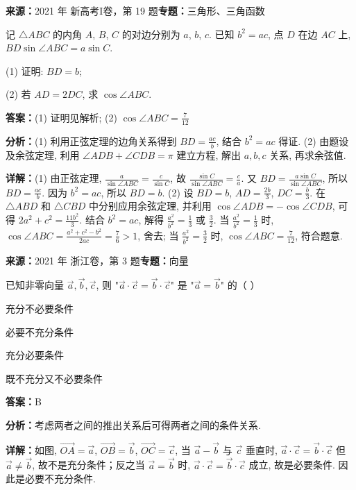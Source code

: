 \begin{question}[points=12]
\textbf{来源：}2021 年 新高考I卷，第 19 题\quad \textbf{专题：}三角形、三角函数\par
记 $\triangle ABC$ 的内角 $A$, $B$, $C$ 的对边分别为 $a$, $b$, $c$. 已知 $b^2 = ac$, 点 $D$ 在边 $AC$ 上, $BD \sin\angle ABC = a \sin C$.

(1) 证明: $BD = b$;

(2) 若 $AD = 2DC$, 求 $\cos\angle ABC$.
\begin{solution}
\textbf{答案：}(1) 证明见解析; (2) $\cos\angle ABC = \frac{7}{12}$

\textbf{分析：}(1) 利用正弦定理的边角关系得到 $BD = \frac{ac}{b}$, 结合 $b^2 = ac$ 得证. (2) 由题设及余弦定理, 利用 $\angle ADB + \angle CDB = \pi$ 建立方程, 解出 $a,b,c$ 关系, 再求余弦值.

\textbf{详解：}(1) 由正弦定理, $\frac{a}{\sin\angle ABC} = \frac{c}{\sin C}$, 故 $\frac{\sin C}{\sin\angle ABC} = \frac{c}{a}$. 又 $BD = \frac{a\sin C}{\sin\angle ABC}$, 所以 $BD = \frac{ac}{b}$. 因为 $b^2 = ac$, 所以 $BD = b$.
(2) 设 $BD = b$, $AD = \frac{2b}{3}$, $DC = \frac{b}{3}$. 在 $\triangle ABD$ 和 $\triangle CBD$ 中分别应用余弦定理, 并利用 $\cos\angle ADB = -\cos\angle CDB$, 可得 $2a^2 + c^2 = \frac{11b^2}{3}$. 结合 $b^2 = ac$, 解得 $\frac{a^2}{b^2} = \frac{1}{3}$ 或 $\frac{3}{2}$. 当 $\frac{a^2}{b^2} = \frac{1}{3}$ 时, $\cos\angle ABC = \frac{a^2 + c^2 - b^2}{2ac} = \frac{7}{6} > 1$, 舍去; 当 $\frac{a^2}{b^2} = \frac{3}{2}$ 时, $\cos\angle ABC = \frac{7}{12}$, 符合题意.
\end{solution}
\end{question}

\begin{question}[points=4]
\textbf{来源：}2021 年 浙江卷，第 3 题\quad \textbf{专题：}向量\par
已知非零向量 $\vec{a},\vec{b},\vec{c}$, 则 "$\vec{a}\cdot\vec{c}=\vec{b}\cdot\vec{c}$" 是 "$\vec{a}=\vec{b}$" 的（   ）
\begin{choices}
  \item 充分不必要条件
  \item 必要不充分条件
  \item 充分必要条件
  \item 既不充分又不必要条件
\end{choices}
\begin{solution}
\textbf{答案：}B

\textbf{分析：}考虑两者之间的推出关系后可得两者之间的条件关系.

\textbf{详解：}如图, $\overrightarrow{OA}=\vec{a}$, $\overrightarrow{OB}=\vec{b}$, $\overrightarrow{OC}=\vec{c}$, 当 $\vec{a}-\vec{b}$ 与 $\vec{c}$ 垂直时, $\vec{a}\cdot\vec{c}=\vec{b}\cdot\vec{c}$ 但 $\vec{a}\neq\vec{b}$, 故不是充分条件；反之当 $\vec{a}=\vec{b}$ 时, $\vec{a}\cdot\vec{c}=\vec{b}\cdot\vec{c}$ 成立, 故是必要条件. 因此是必要不充分条件.
\end{solution}
\end{question}

